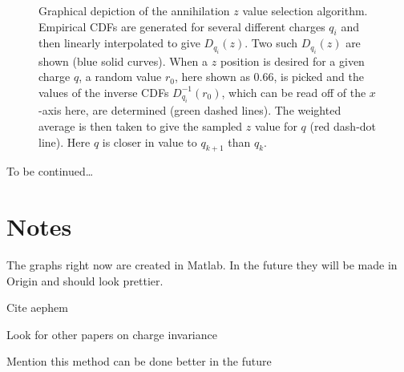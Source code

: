 \documentclass[superscriptaddress,aps,prb,11pt]{revtex4-1}
\begin{document}
\begin{figure}
  \caption{Graphical depiction of the annihilation $z$ value selection algorithm.  Empirical CDFs are generated for several different charges $q_i$ and then linearly interpolated to give $D_{q_i}(z)$.  Two such $D_{q_i}(z)$ are shown (blue solid curves).  When a $z$ position is desired for a given charge $q$, a random value $r_0$, here shown as 0.66, is picked and the values of the inverse CDFs $D^{-1}_{q_i}(r_0)$, which can be read off of the $x$-axis here, are determined (green dashed lines).  The weighted average is then taken to give the sampled $z$ value for $q$ (red dash-dot line).  Here $q$ is closer in value to $q_{k+1}$ than $q_k$.}
  \label{fig:z_interpolation}
\end{figure}

\begin{acknowledgments}
To be continued\ldots
\end{acknowledgments}

\section{Notes}
The graphs right now are created in Matlab.  In the future they will be made in Origin and should look prettier.

Cite aephem

Look for other papers on charge invariance

Mention this method can be done better in the future



\end{document}
